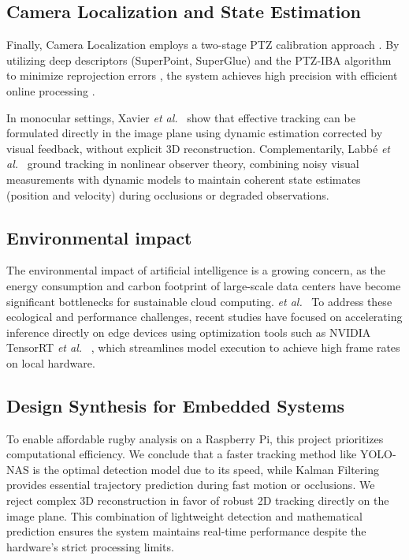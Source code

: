 \documentclass[conference]{IEEEtran}
\begin{document}
\subsection{Camera Localization and State Estimation}
Finally, Camera Localization employs a two-stage PTZ calibration approach \cite{AlHadrusi2012PTZ}. By utilizing deep descriptors (SuperPoint, SuperGlue) and the PTZ-IBA algorithm to minimize reprojection errors \cite{Labbe2010NonlinearObserver, Xavier2001VisualServoing}, the system achieves high precision with efficient online processing \cite{Pix4Team}.

In monocular settings, Xavier \textit{et al.}~\cite{Xavier2001VisualServoing} show that effective tracking can be formulated directly in the image plane using dynamic estimation corrected by visual feedback, without explicit 3D reconstruction. Complementarily, Labbé \textit{et al.}~\cite{Labbe2010NonlinearObserver} ground tracking in nonlinear observer theory, combining noisy visual measurements with dynamic models to maintain coherent state estimates (position and velocity) during occlusions or degraded observations.

\subsection{Environmental impact}
The environmental impact of artificial intelligence is a growing concern, as the energy consumption and carbon footprint of large-scale data centers have become significant bottlenecks for sustainable cloud computing. \textit{et al.}~\cite{Labbe2010NonlinearObserver} To address these ecological and performance challenges, recent studies have focused on accelerating inference directly on edge devices using optimization tools such as NVIDIA TensorRT \textit{et al.}~\cite{Labbe2010NonlinearObserver} , which streamlines model execution to achieve high frame rates on local hardware.

\subsection{Design Synthesis for Embedded Systems}
To enable affordable rugby analysis on a Raspberry Pi, this project prioritizes computational efficiency. We conclude that a faster tracking method like YOLO-NAS is the optimal detection model due to its speed, while Kalman Filtering provides essential trajectory prediction during fast motion or occlusions. We reject complex 3D reconstruction in favor of robust 2D tracking directly on the image plane. This combination of lightweight detection and mathematical prediction ensures the system maintains real-time performance despite the hardware's strict processing limits.
\end{document}
